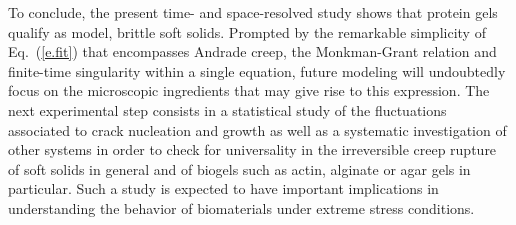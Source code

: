 \documentclass[twocolumn,superscriptaddress,showpacs,preprintnumbers,amsmath,amssymb,prl]{revtex4}
\begin{document}
To conclude, the present time- and space-resolved study shows that protein gels qualify as model, brittle soft solids. Prompted by the remarkable simplicity of Eq.~(\ref{e.fit}) that encompasses Andrade creep, the Monkman-Grant relation and finite-time singularity within a single equation, future modeling will undoubtedly focus on the microscopic ingredients that may give rise to this expression. The next experimental step consists in a statistical study of the fluctuations associated to crack nucleation and growth as well as a systematic investigation of other systems in order to check for universality in the irreversible creep rupture of soft solids in general and of biogels such as actin, alginate or agar gels in particular. Such a study is expected to have important implications in understanding the behavior of biomaterials under extreme stress conditions.




\end{document}
